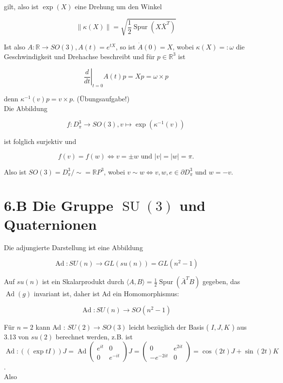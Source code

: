 \documentclass[10pt, letterpaper]{article}
\begin{document}
gilt, also ist $\exp (X)$ eine Drehung um den Winkel

$$
\|\kappa(X)\|=\sqrt{\frac{1}{2} \operatorname{Spur}\left(X \bar{X}^{T}\right)}
$$

Ist also $A: \mathbb{R} \rightarrow S O(3), A(t)=e^{t X}$, so ist $\dot{A}(0)=X$, wobei $\kappa(X)=: \omega$ die Geschwindigkeit und Drehachse beschreibt und für $p \in \mathbb{R}^{3}$ ist

$$
\left.\frac{d}{d t}\right|_{t=0} A(t) p=X p=\omega \times p
$$

denn $\kappa^{-1}(v) p=v \times p$. (Übungsaufgabe!)\\
Die Abbildung

$$
f: D_{\pi}^{3} \rightarrow S O(3), v \mapsto \exp \left(\kappa^{-1}(v)\right)
$$

ist folglich surjektiv und

$$
f(v)=f(w) \Leftrightarrow v= \pm w \text { und }|v|=|w|=\pi .
$$

Also ist $S O(3)=D_{\pi}^{3} / \sim=\mathbb{R} P^{3}$, wobei $v \sim w \Leftrightarrow v, w, e \in \partial D_{\pi}^{3}$ und $w=-v$.

\section*{6.B Die Gruppe $\operatorname{SU}(3)$ und Quaternionen}
Die adjungierte Darstellung ist eine Abbildung

$$
\operatorname{Ad}: S U(n) \rightarrow G L(s u(n))=G L\left(n^{2}-1\right)
$$

Auf $s u(n)$ ist ein Skalarprodukt durch $\langle A, B\rangle=\frac{1}{2} \operatorname{Spur}\left(\bar{A}^{T} B\right)$ gegeben, das $\operatorname{Ad}(g)$ invariant ist, daher ist Ad ein Homomorphismus:

$$
\operatorname{Ad}: S U(n) \rightarrow S O\left(n^{2}-1\right)
$$

Für $n=2$ kann Ad : $S U(2) \rightarrow S O(3)$ leicht bezüglich der Basis ( $I, J, K$ ) aus 3.13 von $s u(2)$ berechnet werden, z.B. ist\\
$\operatorname{Ad}:((\exp t I)) J=\operatorname{Ad}\left(\begin{array}{cc}e^{i t} & 0 \\ 0 & e^{-i t}\end{array}\right) J=\left(\begin{array}{cc}0 & e^{2 i t} \\ -e^{-2 i t} & 0\end{array}\right)=\cos (2 t) J+\sin (2 t) K$.\\
Also
\end{document}

